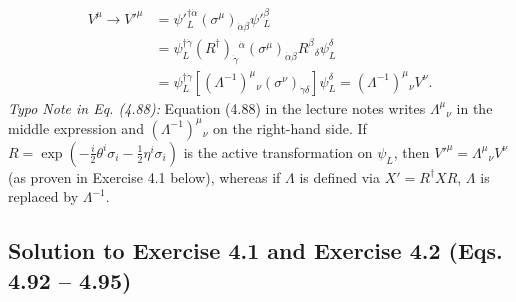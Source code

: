 \documentclass[11pt,a4paper]{article}
\begin{document}
\begin{itemize}
    \begin{align}
        V^\mu \longrightarrow V'^\mu &= \psi'^{\dagger\dot{\alpha}}_L (\sigma^\mu)_{\dot{\alpha}\beta} \psi'^\beta_L \nonumber \\
        &= \psi_L^{\dagger\dot{\gamma}} (R^\dagger)_{\dot{\gamma}}{}^{\dot{\alpha}} (\sigma^\mu)_{\dot{\alpha}\beta} R^\beta{}_\delta \psi_L^\delta \nonumber \\
        &= \psi_L^{\dagger\dot{\gamma}} \left[(\Lambda^{-1})^\mu{}_\nu (\sigma^\nu)_{\dot{\gamma}\delta}\right] \psi_L^\delta = (\Lambda^{-1})^\mu{}_\nu V^\nu.
    \end{align}
    \emph{Typo Note in Eq. (4.88):} Equation (4.88) in the lecture notes writes $\Lambda^\mu{}_\nu$ in the middle expression and $(\Lambda^{-1})^\mu{}_\nu$ on the right-hand side. If $R = \exp(-\frac{i}{2}\theta^i\sigma_i - \frac{1}{2}\eta^i\sigma_i)$ is the active transformation on $\psi_L$, then $V'^\mu = \Lambda^\mu{}_\nu V^\nu$ (as proven in Exercise 4.1 below), whereas if $\Lambda$ is defined via $X' = R^\dagger X R$, $\Lambda$ is replaced by $\Lambda^{-1}$.
\end{itemize}

\subsection{Solution to Exercise 4.1 and Exercise 4.2 (Eqs. 4.92 -- 4.95)}
\end{document}
